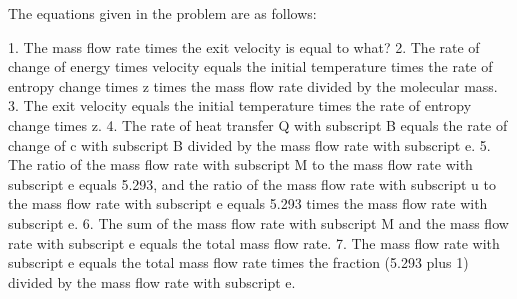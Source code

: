 The equations given in the problem are as follows:

1. The mass flow rate times the exit velocity is equal to what?
2. The rate of change of energy times velocity equals the initial temperature times the rate of entropy change times z times the mass flow rate divided by the molecular mass.
3. The exit velocity equals the initial temperature times the rate of entropy change times z.
4. The rate of heat transfer Q with subscript B equals the rate of change of c with subscript B divided by the mass flow rate with subscript e.
5. The ratio of the mass flow rate with subscript M to the mass flow rate with subscript e equals 5.293, and the ratio of the mass flow rate with subscript u to the mass flow rate with subscript e equals 5.293 times the mass flow rate with subscript e.
6. The sum of the mass flow rate with subscript M and the mass flow rate with subscript e equals the total mass flow rate.
7. The mass flow rate with subscript e equals the total mass flow rate times the fraction (5.293 plus 1) divided by the mass flow rate with subscript e.